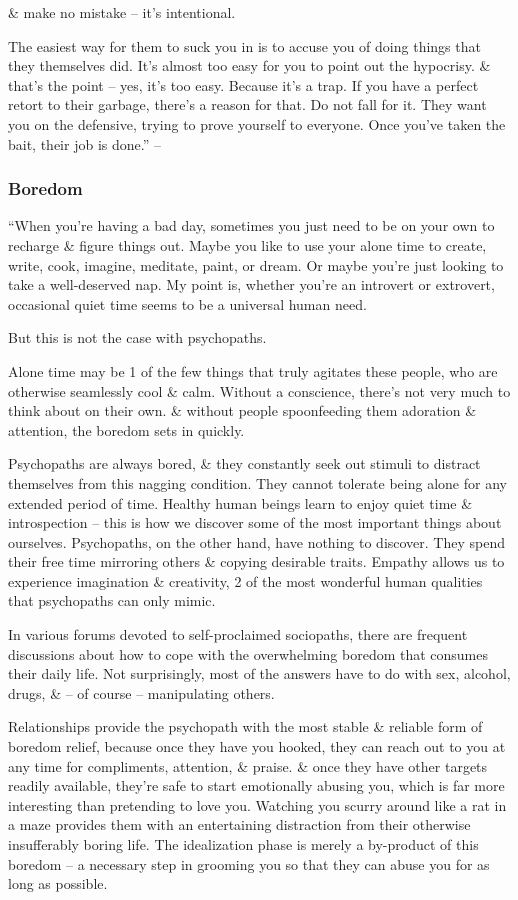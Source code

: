\documentclass{article}
\numberwithin{equation}{section}
\begin{document}
\& make no mistake -- it's intentional.

The easiest way for them to suck you in is to accuse you of doing things that they themselves did. It's almost too easy for you to point out the hypocrisy. \& that's the point -- yes, it's too easy. Because it's a trap. If you have a perfect retort to their garbage, there's a reason for that. Do not fall for it. They want you on the defensive, trying to prove yourself to everyone. Once you've taken the bait, their job is done.'' -- \cite[pp. 54--55]{MacKenzie2015}

\subsubsection{Boredom}
``When you're having a bad day, sometimes you just need to be on your own to recharge \& figure things out. Maybe you like to use your alone time to create, write, cook, imagine, meditate, paint, or dream. Or maybe you're just looking to take a well-deserved nap. My point is, whether you're an introvert or extrovert, occasional quiet time seems to be a universal human need.

But this is not the case with psychopaths.

Alone time may be 1 of the few things that truly agitates these people, who are otherwise seamlessly cool \& calm. Without a conscience, there's not very much to think about on their own. \& without people spoonfeeding them adoration \& attention, the boredom sets in quickly.

Psychopaths are always bored, \& they constantly seek out stimuli to distract themselves from this nagging condition. They cannot tolerate being alone for any extended period of time. Healthy human beings learn to enjoy quiet time \& introspection -- this is how we discover some of the most important things about ourselves. Psychopaths, on the other hand, have nothing to discover. They spend their free time mirroring others \& copying desirable traits. Empathy allows us to experience imagination \& creativity, 2 of the most wonderful human qualities that psychopaths can only mimic.

In various forums devoted to self-proclaimed sociopaths, there are frequent discussions about how to cope with the overwhelming boredom that consumes their daily life. Not surprisingly, most of the answers have to do with sex, alcohol, drugs, \& -- of course -- manipulating others.

Relationships provide the psychopath with the most stable \& reliable form of boredom relief, because once they have you hooked, they can reach out to you at any time for compliments, attention, \& praise. \& once they have other targets readily available, they're safe to start emotionally abusing you, which is far more interesting than pretending to love you. Watching you scurry around like a rat in a maze provides them with an entertaining distraction from their otherwise insufferably boring life. The idealization phase is merely a by-product of this boredom -- a necessary step in grooming you so that they can abuse you for as long as possible.
\end{document}
